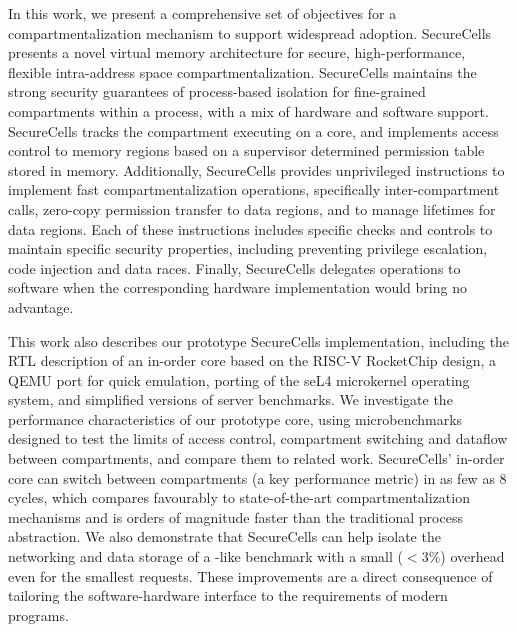 In this work, we present a comprehensive set of objectives for a 
compartmentalization mechanism to support widespread adoption.
SecureCells presents a novel virtual memory architecture for secure, 
high-performance, flexible intra-address space compartmentalization.
SecureCells maintains the strong security guarantees of process-based isolation
for fine-grained compartments within a process, with a mix of hardware and
software support.
SecureCells tracks the compartment executing on a core, and implements access
control to memory regions based on a supervisor determined permission table
stored in memory.
Additionally, SecureCells provides unprivileged instructions to implement
fast compartmentalization operations, specifically inter-compartment calls,
zero-copy permission transfer to data regions, and to manage lifetimes for
data regions.
Each of these instructions includes specific checks and controls to maintain
specific security properties, including preventing privilege escalation,
code injection and data races.
Finally, SecureCells delegates operations to software when the corresponding
hardware implementation would bring no advantage.

This work also describes our prototype SecureCells implementation, including
the RTL description of an in-order core based on the RISC-V RocketChip design,
a QEMU port for quick emulation, porting of the seL4 microkernel operating
system, and simplified versions of server benchmarks.
We investigate the performance characteristics of our prototype core, using
microbenchmarks designed to test the limits of access control, compartment 
switching and dataflow between compartments, and compare them to related work.
SecureCells' in-order core can switch between compartments (a key performance
metric) in as few as 8 cycles, which compares favourably to state-of-the-art
compartmentalization mechanisms and is orders of magnitude faster than the
traditional process abstraction.
We also demonstrate that SecureCells can help isolate the networking and
data storage of a -like benchmark with a small ($<3\%$)
overhead even for the smallest requests.
These improvements are a direct consequence of tailoring the software-hardware
interface to the requirements of modern programs.

